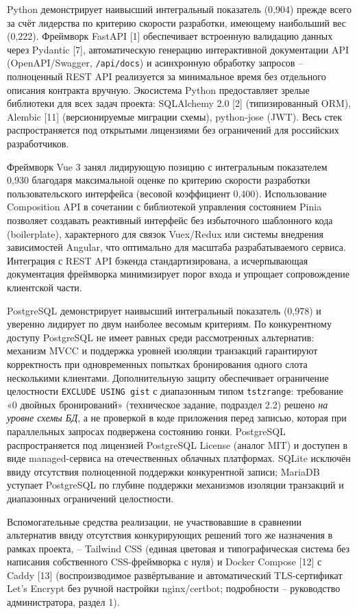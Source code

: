 Python демонстрирует наивысший интегральный показатель (0,904) прежде
всего за счёт лидерства по критерию скорости разработки, имеющему
наибольший вес (0,222). Фреймворк FastAPI [1] обеспечивает встроенную
валидацию данных через Pydantic [7], автоматическую генерацию
интерактивной документации API (OpenAPI/Swagger, \texttt{/api/docs}) и
асинхронную обработку запросов -- полноценный REST API реализуется за
минимальное время без отдельного описания контракта вручную. Экосистема
Python предоставляет зрелые библиотеки для всех задач проекта:
SQLAlchemy 2.0 [2] (типизированный ORM), Alembic [11] (версионируемые
миграции схемы), python-jose (JWT). Весь стек распространяется под
открытыми лицензиями без ограничений для российских разработчиков.

Фреймворк Vue 3 занял лидирующую позицию с интегральным показателем
0,930 благодаря максимальной оценке по критерию скорости разработки
пользовательского интерфейса (весовой коэффициент 0,400). Использование
Composition API в сочетании с библиотекой управления состоянием Pinia
позволяет создавать реактивный интерфейс без избыточного шаблонного
кода (boilerplate), характерного для связок Vuex/Redux или системы
внедрения зависимостей Angular, что оптимально для масштаба
разрабатываемого сервиса. Интеграция с REST API бэкенда стандартизирована,
а исчерпывающая документация фреймворка минимизирует порог входа и
упрощает сопровождение клиентской части.

PostgreSQL демонстрирует наивысший интегральный показатель (0,978) и
уверенно лидирует по двум наиболее весомым критериям. По конкурентному
доступу PostgreSQL не имеет равных среди рассмотренных альтернатив:
механизм MVCC и поддержка уровней изоляции транзакций гарантируют
корректность при одновременных попытках бронирования одного слота
несколькими клиентами. Дополнительную защиту обеспечивает ограничение
целостности \texttt{EXCLUDE USING gist} с диапазонным типом
\texttt{tstzrange}: требование «0 двойных бронирований» (техническое
задание, подраздел 2.2) решено \emph{на уровне схемы БД}, а не проверкой в
коде приложения перед записью, которая при параллельных запросах
подвержена состоянию гонки. PostgreSQL распространяется под лицензией
PostgreSQL License (аналог MIT) и доступен в виде managed-сервиса на
отечественных облачных платформах. SQLite исключён ввиду отсутствия
полноценной поддержки конкурентной записи; MariaDB уступает PostgreSQL
по глубине поддержки механизмов изоляции транзакций и диапазонных
ограничений целостности.

Вспомогательные средства реализации, не участвовавшие в сравнении
альтернатив ввиду отсутствия конкурирующих решений того же назначения в
рамках проекта, -- Tailwind CSS (единая цветовая и типографическая
система без написания собственного CSS-фреймворка с нуля) и Docker
Compose [12] с Caddy [13] (воспроизводимое развёртывание и
автоматический TLS-сертификат Let's Encrypt без ручной настройки
nginx/certbot; подробности -- руководство администратора, раздел 1).


